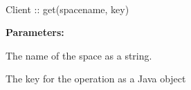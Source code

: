 %
%
%


\paragraph{}
\label{api:java:get}
\begin{javacode}
Client :: get(spacename, key)
\end{javacode}


\noindent\textbf{Parameters:}
\begin{description}[labelindent=\widthof{{\code{spacename}}},leftmargin=*,noitemsep,nolistsep,align=right]
\item[\code{spacename}] The name of the space as a string.
\item[\code{key}] The key for the operation as a Java object
\end{description}


